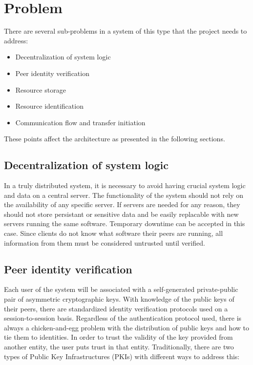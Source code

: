 \section{Problem}
\label{sec:problem}

There are several sub-problems in a system of this type that the project needs to address:

\begin{itemize}
\item Decentralization of system logic
\item Peer identity verification
\item Resource storage
\item Resource identification
\item Communication flow and transfer initiation
\end{itemize}

These points affect the architecture as presented in the following sections.

\subsection{Decentralization of system logic}
In a truly distributed system, it is necessary to avoid having crucial system logic and data on a central server. The functionality of the system should not rely on the availability of any specific server. If servers are needed for any reason, they should not store persistant or sensitive data and be easily replacable with new servers running the same software. Temporary downtime can be accepted in this case. Since clients do not know what software their peers are running, all information from them must be considered untrusted until verified.

\subsection{Peer identity verification}
Each user of the system will be associated with a self-generated private-public pair of asymmetric cryptographic keys. With knowledge of the public keys of their peers, there are standardized identity verification protocols used on a session-to-session basis. Regardless of the authentication protocol used, there is always a chicken-and-egg problem with the distribution of public keys and how to tie them to identities. In order to trust the validity of the key provided from another entity, the user puts trust in that entity. Traditionally, there are two types of Public Key Infrastructures (PKIs) with different ways to address this:

